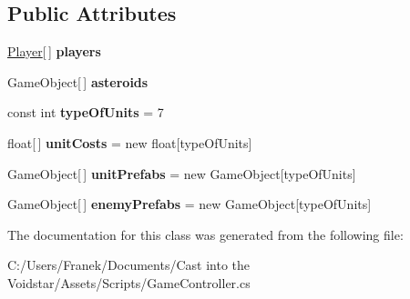 \subsection*{Public Attributes}
\begin{DoxyCompactItemize}
\item 
\hypertarget{class_game_controller_a674085d39c0f50688fe9af5f9596d806}{}\hyperlink{class_game_controller_1_1_player}{Player}\mbox{[}$\,$\mbox{]} {\bfseries players}\label{class_game_controller_a674085d39c0f50688fe9af5f9596d806}

\item 
\hypertarget{class_game_controller_aa81cbf39eea608ee93dc76c572b42195}{}Game\+Object\mbox{[}$\,$\mbox{]} {\bfseries asteroids}\label{class_game_controller_aa81cbf39eea608ee93dc76c572b42195}

\item 
\hypertarget{class_game_controller_a129b256ff0d239cac52dbc5882f147b1}{}const int {\bfseries type\+Of\+Units} = 7\label{class_game_controller_a129b256ff0d239cac52dbc5882f147b1}

\item 
\hypertarget{class_game_controller_a7d09c64261bcee941e31fe9b1db7272c}{}float\mbox{[}$\,$\mbox{]} {\bfseries unit\+Costs} = new float\mbox{[}type\+Of\+Units\mbox{]}\label{class_game_controller_a7d09c64261bcee941e31fe9b1db7272c}

\item 
\hypertarget{class_game_controller_aeb780e3e7da55b2127fee53ee5ee3d81}{}Game\+Object\mbox{[}$\,$\mbox{]} {\bfseries unit\+Prefabs} = new Game\+Object\mbox{[}type\+Of\+Units\mbox{]}\label{class_game_controller_aeb780e3e7da55b2127fee53ee5ee3d81}

\item 
\hypertarget{class_game_controller_a994169e702283f71d719b2e6889153f1}{}Game\+Object\mbox{[}$\,$\mbox{]} {\bfseries enemy\+Prefabs} = new Game\+Object\mbox{[}type\+Of\+Units\mbox{]}\label{class_game_controller_a994169e702283f71d719b2e6889153f1}

\end{DoxyCompactItemize}


The documentation for this class was generated from the following file\+:\begin{DoxyCompactItemize}
\item 
C\+:/\+Users/\+Franek/\+Documents/\+Cast into the Voidstar/\+Assets/\+Scripts/Game\+Controller.\+cs\end{DoxyCompactItemize}

